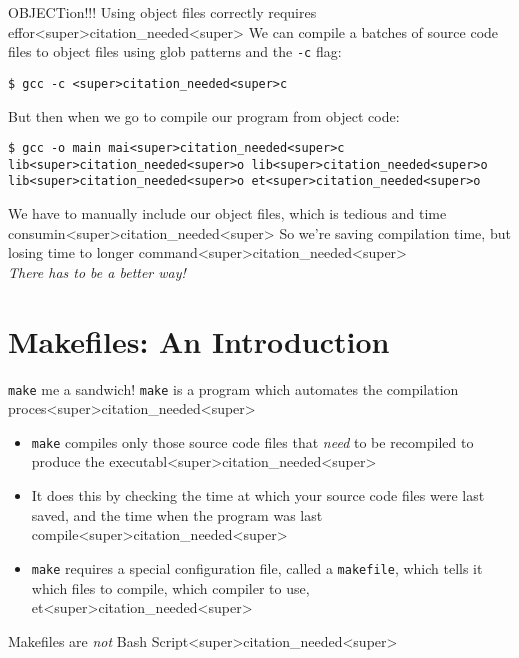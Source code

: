 \documentclass[11pt]{beamer}
\begin{document}
\begin{frame}[fragile=singleslide]{OBJECTion!!!}
Using object files correctly requires effor<super>citation_needed<super>  We can compile a batches of source code files to object files using glob patterns and the \texttt{-c} flag:
\begin{lstlisting}[style=terminal]
$ gcc -c <super>citation_needed<super>c
\end{lstlisting}
But then when we go to compile our program from object code:
\begin{lstlisting}[style=terminal]
$ gcc -o main mai<super>citation_needed<super>c lib<super>citation_needed<super>o lib<super>citation_needed<super>o lib<super>citation_needed<super>o et<super>citation_needed<super>o 
\end{lstlisting}
We have to manually include our object files, which is tedious and time consumin<super>citation_needed<super> So we're saving compilation time, but losing time to longer command<super>citation_needed<super>\\ 
\vspace{1em}
\center
\textit{There has to be a better way!} \\
\end{frame}

\section[Makefiles]{Makefiles: An Introduction}
\begin{frame}{\texttt{make} me a sandwich!}
\texttt{make} is a program which automates the compilation proces<super>citation_needed<super>
\begin{itemize}
\item \texttt{make} compiles only those source code files that \textit{need} to be recompiled to produce the executabl<super>citation_needed<super>
\item It does this by checking the time at which your source code files were last saved, and the time when the program was last compile<super>citation_needed<super>
\item \texttt{make} requires a special configuration file, called a \texttt{makefile}, which tells it which files to compile, which compiler to use, et<super>citation_needed<super>
\end{itemize}
\vspace{1em}
\center
Makefiles are \emph{not} Bash Script<super>citation_needed<super>  
\end{frame}
\end{document}
